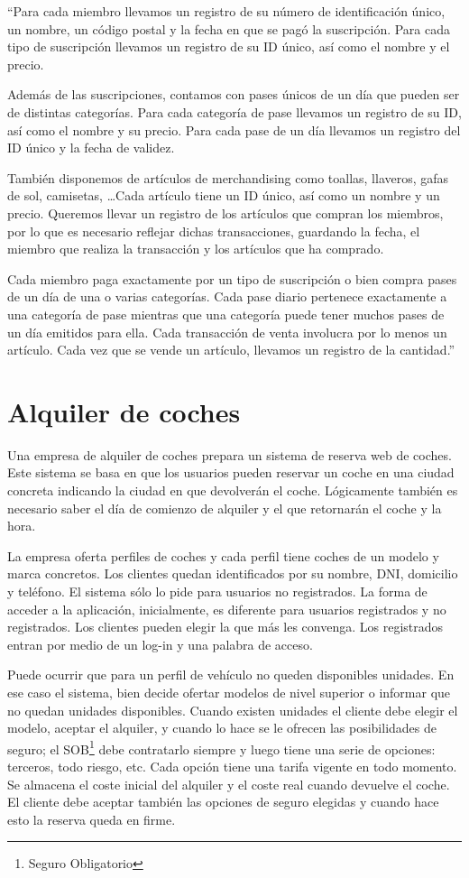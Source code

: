 \documentclass[a4paper]{article}
\begin{document}
``Para cada miembro llevamos un registro de su número de identificación único, un nombre, un código postal y la fecha en que se pagó la suscripción. Para cada tipo de suscripción llevamos un registro de su ID único, así como el nombre y el precio. 

Además de las suscripciones, contamos con pases únicos de un día que pueden ser de distintas categorías. Para cada categoría de pase llevamos un registro de su ID, así como el nombre y su precio. Para cada pase de un día llevamos un registro del ID único y la fecha de validez.

También disponemos de artículos de merchandising como toallas, llaveros, gafas de sol, camisetas, \ldots Cada artículo tiene un ID único, así como un nombre y un precio. Queremos llevar un registro de los artículos que compran los miembros, por lo que es necesario reflejar dichas transacciones, guardando la fecha, el miembro que realiza la transacción y los artículos que ha comprado.

Cada miembro paga exactamente por un tipo de suscripción o bien compra pases de un día de una o varias categorías. Cada pase diario pertenece exactamente a una categoría de pase mientras que una categoría puede tener muchos pases de un día emitidos para ella. Cada transacción de venta involucra por lo menos un artículo. Cada vez que se vende un artículo, llevamos un registro de la cantidad.''

\section{Alquiler de coches}
Una empresa de alquiler de coches prepara un sistema de reserva web de coches. Este sistema se basa en que los usuarios pueden reservar un coche en una ciudad concreta indicando la ciudad en que devolverán el coche. Lógicamente también es necesario saber el día de comienzo de alquiler y el que retornarán el coche y la hora. 

La empresa oferta perfiles de coches y cada perfil tiene coches de un modelo y marca concretos. Los clientes quedan identificados por su nombre, DNI, domicilio y teléfono. El sistema sólo lo pide para usuarios no registrados. La forma de acceder a la aplicación, inicialmente, es diferente para usuarios registrados y no registrados. Los clientes pueden elegir la que más les convenga. Los registrados entran por medio de un log-in y una palabra de acceso.

Puede ocurrir que para un perfil de vehículo no queden disponibles unidades. En ese caso el sistema, bien decide ofertar modelos de nivel superior o informar que no quedan unidades disponibles. Cuando existen unidades el cliente debe elegir el modelo, aceptar el alquiler, y cuando lo hace se le ofrecen las posibilidades de seguro; el SOB\footnote{Seguro Obligatorio} debe contratarlo siempre y luego tiene una serie de opciones: terceros, todo riesgo, etc. Cada opción tiene una tarifa vigente en todo momento. Se almacena el coste inicial del alquiler y el coste real cuando devuelve el coche. El cliente debe aceptar también las opciones de seguro elegidas y cuando hace esto la reserva queda en firme. 
\end{document}
